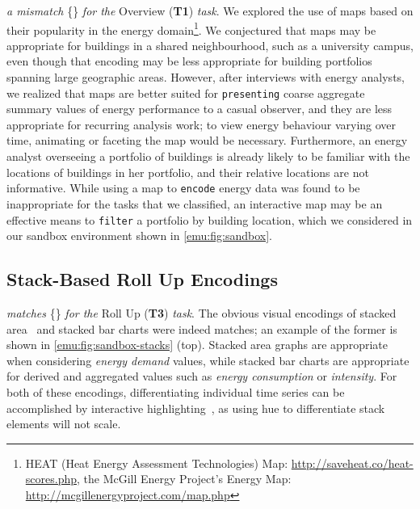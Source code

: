 \begin{sloppypar}
 {\it a mismatch} \{\mismatch\} {\it for the} Overview ({\bf T1}) {\it task}.
We explored the use of maps based on their popularity in the energy domain\footnote{\eg HEAT (Heat Energy Assessment Technologies) Map: \url{http://saveheat.co/heat-scores.php}, the McGill Energy Project's Energy Map: \url{http://mcgillenergyproject.com/map.php}}. 
We conjectured that maps may be appropriate for buildings in a shared neighbourhood, such as a university campus, even though that encoding may be less appropriate for building portfolios spanning large geographic areas. 
However, after interviews with energy analysts, we realized that maps are better suited for {\tt presenting} coarse aggregate summary values of energy performance to a casual observer, and they are less appropriate for recurring analysis work; to view energy behaviour varying over time, animating or faceting the map would be necessary. 
Furthermore, an energy analyst overseeing a portfolio of buildings is already likely to be familiar with the locations of buildings in her portfolio, and their relative locations are not informative. 
While using a map to {\tt encode} energy data was found to be inappropriate for the tasks that we classified, an interactive map may be an effective means to {\tt filter} a portfolio by building location, which we considered in our sandbox environment shown in \autoref{emu:fig:sandbox}.
\end{sloppypar}

\subsection{Stack-Based Roll Up Encodings}
\label{emu:design-rollup}


 {\it matches} \{\match\} {\it for the} Roll Up ({\bf T3}) {\it task}.
The obvious visual encodings of stacked area~\cite{Byron2008} and stacked bar charts were indeed matches; an example of the former is shown in \autoref{emu:fig:sandbox-stacks} (top).
Stacked area graphs are appropriate when considering {\it energy demand} values, while stacked bar charts are appropriate for derived and aggregated values such as {\it energy consumption} or {\it intensity}.
For both of these encodings, differentiating individual time series can be accomplished by interactive highlighting~\cite{Wattenberg2005}, as using hue to differentiate stack elements will not scale.

